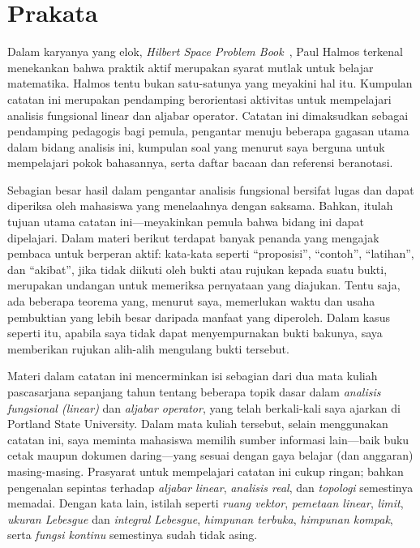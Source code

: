 \chapter*{Prakata}

Dalam karyanya yang elok, \emph{Hilbert Space Problem
Book}~\cite{Halmos:1982}, Paul Halmos terkenal menekankan bahwa praktik aktif merupakan
syarat mutlak untuk belajar matematika. Halmos tentu bukan satu-satunya yang meyakini hal
itu. Kumpulan catatan ini merupakan pendamping berorientasi aktivitas
untuk mempelajari analisis fungsional linear dan aljabar operator. Catatan ini dimaksudkan
sebagai pendamping pedagogis bagi pemula, pengantar menuju beberapa gagasan utama dalam
bidang analisis ini, kumpulan soal yang menurut saya berguna untuk mempelajari pokok
bahasannya, serta daftar bacaan dan referensi beranotasi.

Sebagian besar hasil dalam pengantar analisis fungsional bersifat lugas dan dapat
diperiksa oleh mahasiswa yang menelaahnya dengan saksama. Bahkan, itulah tujuan utama
catatan ini---meyakinkan pemula bahwa bidang ini dapat dipelajari. Dalam materi berikut
terdapat banyak penanda yang mengajak pembaca untuk berperan aktif: kata-kata seperti
``proposisi'', ``contoh'', ``latihan'', dan ``akibat'', jika tidak diikuti oleh bukti
atau rujukan kepada suatu bukti, merupakan undangan untuk memeriksa pernyataan yang
diajukan. Tentu saja, ada beberapa teorema yang, menurut saya, memerlukan waktu dan usaha
pembuktian yang lebih besar daripada manfaat yang diperoleh. Dalam kasus seperti itu,
apabila saya tidak dapat menyempurnakan bukti bakunya, saya memberikan rujukan alih-alih
mengulang bukti tersebut.

Materi dalam catatan ini mencerminkan isi sebagian dari dua mata kuliah pascasarjana
sepanjang tahun tentang beberapa topik dasar dalam \emph{analisis fungsional (linear)}
dan \emph{aljabar operator}, yang telah berkali-kali saya ajarkan di Portland State
University. Dalam mata kuliah tersebut, selain menggunakan catatan ini, saya meminta
mahasiswa memilih sumber informasi lain---baik buku cetak maupun dokumen daring---yang
sesuai dengan gaya belajar (dan anggaran) masing-masing. Prasyarat untuk mempelajari
catatan ini cukup ringan; bahkan pengenalan sepintas terhadap \emph{aljabar linear},
\emph{analisis real}, dan \emph{topologi} semestinya memadai. Dengan kata lain, istilah
seperti \emph{ruang vektor}, \emph{pemetaan linear}, \emph{limit}, \emph{ukuran Lebesgue}
dan \emph{integral Lebesgue}, \emph{himpunan terbuka}, \emph{himpunan kompak}, serta
\emph{fungsi kontinu} semestinya sudah tidak asing.

